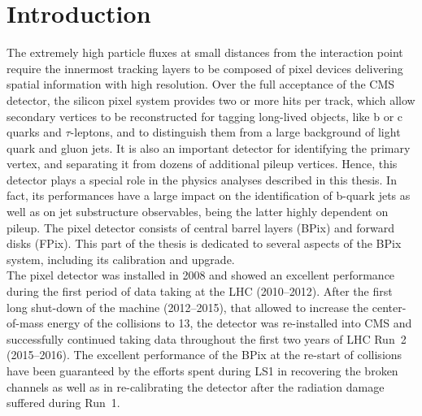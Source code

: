 \chapter{Introduction}\label{ch:BPixIntro}

The extremely high particle fluxes at small distances from the interaction point require the innermost tracking layers to be composed of pixel devices delivering spatial information with high resolution.
Over the full acceptance of the CMS detector, the silicon pixel system provides two or more hits per track, which allow secondary vertices to be reconstructed for tagging long-lived objects, like b or c quarks and $\tau$-leptons, and to distinguish them from a large background of light quark and gluon jets. It is also an important detector for identifying the primary vertex, and separating it from dozens of additional pileup vertices.
Hence, this detector plays a special role in the physics analyses described in this thesis. In fact, its performances have a large impact on the identification of b-quark jets as well as on jet substructure observables, being the latter highly dependent on pileup.
The pixel detector consists of central barrel layers (BPix) and forward disks (FPix).
This part of the thesis is dedicated to several aspects of the BPix system, including its calibration and upgrade.\\ 

The pixel detector was installed in 2008 and showed an excellent performance during the first period of data taking at the LHC (2010--2012).
After the first long shut-down of the machine (2012--2015), that allowed to increase the center-of-mass energy of the collisions to 13\TeV, the detector was re-installed into CMS and successfully continued taking data throughout the first two years of LHC Run~2 (2015--2016). The excellent performance of the BPix at the re-start of collisions have been guaranteed by the efforts spent during LS1 in recovering the broken channels as well as in re-calibrating the detector after the radiation damage suffered during Run~1.

